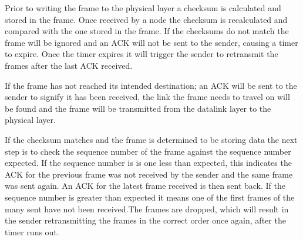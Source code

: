 \documentclass{worksheet}
\begin{document}
Prior to writing the frame to the physical layer a checksum is calculated and stored in the frame. Once received by a node the checksum is recalculated and compared with the one stored in the frame.  If the checksums do not match the frame will be ignored and an ACK will not be sent to the sender, causing a timer to expire. Once the timer expires it will trigger the sender to retransmit the frames after the last ACK received.

If the frame has not reached its intended destination; an ACK will be sent to the sender to signify it has been received, the link the frame needs to travel on will be found and the frame will be transmitted from the datalink layer to the physical layer. 

If the checksum matches and the frame is determined to be storing data the next step is to check the sequence number of the frame against the sequence number expected. If the sequence number is is one less than expected, this indicates the ACK for the previous frame was not received by the sender and the same frame was sent again. An ACK for the latest frame received is then sent back. If the sequence number is greater than expected it means one of the first frames of the many sent have not been received.The frames are dropped, which will result in the sender retransmitting the frames in the correct order once again, after the timer runs out. 
\end{document}
